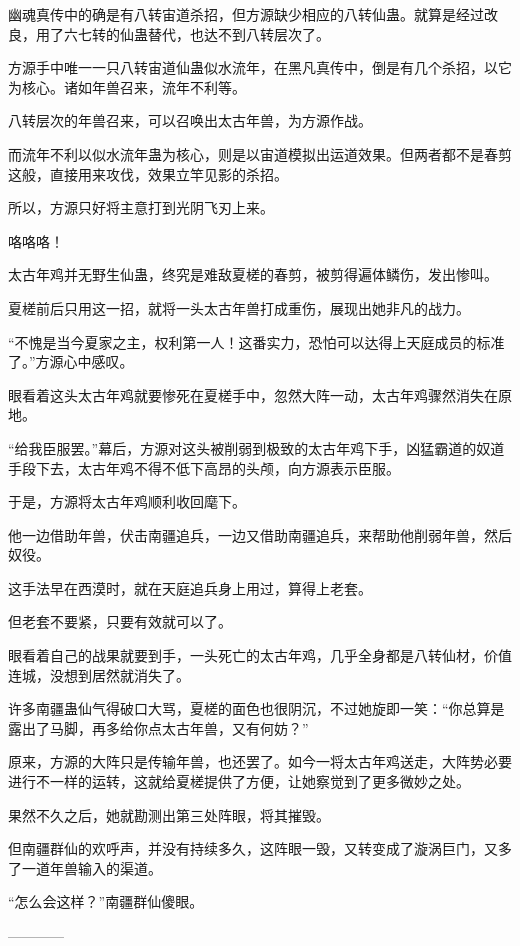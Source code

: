 \begin{this_body}
幽魂真传中的确是有八转宙道杀招，但方源缺少相应的八转仙蛊。就算是经过改良，用了六七转的仙蛊替代，也达不到八转层次了。

方源手中唯一一只八转宙道仙蛊似水流年，在黑凡真传中，倒是有几个杀招，以它为核心。诸如年兽召来，流年不利等。

八转层次的年兽召来，可以召唤出太古年兽，为方源作战。

而流年不利以似水流年蛊为核心，则是以宙道模拟出运道效果。但两者都不是春剪这般，直接用来攻伐，效果立竿见影的杀招。

所以，方源只好将主意打到光阴飞刃上来。

咯咯咯！

太古年鸡并无野生仙蛊，终究是难敌夏槎的春剪，被剪得遍体鳞伤，发出惨叫。

夏槎前后只用这一招，就将一头太古年兽打成重伤，展现出她非凡的战力。

“不愧是当今夏家之主，权利第一人！这番实力，恐怕可以达得上天庭成员的标准了。”方源心中感叹。

眼看着这头太古年鸡就要惨死在夏槎手中，忽然大阵一动，太古年鸡骤然消失在原地。

“给我臣服罢。”幕后，方源对这头被削弱到极致的太古年鸡下手，凶猛霸道的奴道手段下去，太古年鸡不得不低下高昂的头颅，向方源表示臣服。

于是，方源将太古年鸡顺利收回麾下。

他一边借助年兽，伏击南疆追兵，一边又借助南疆追兵，来帮助他削弱年兽，然后奴役。

这手法早在西漠时，就在天庭追兵身上用过，算得上老套。

但老套不要紧，只要有效就可以了。

眼看着自己的战果就要到手，一头死亡的太古年鸡，几乎全身都是八转仙材，价值连城，没想到居然就消失了。

许多南疆蛊仙气得破口大骂，夏槎的面色也很阴沉，不过她旋即一笑：“你总算是露出了马脚，再多给你点太古年兽，又有何妨？”

原来，方源的大阵只是传输年兽，也还罢了。如今一将太古年鸡送走，大阵势必要进行不一样的运转，这就给夏槎提供了方便，让她察觉到了更多微妙之处。

果然不久之后，她就勘测出第三处阵眼，将其摧毁。

但南疆群仙的欢呼声，并没有持续多久，这阵眼一毁，又转变成了漩涡巨门，又多了一道年兽输入的渠道。

“怎么会这样？”南疆群仙傻眼。

------------

\end{this_body}

